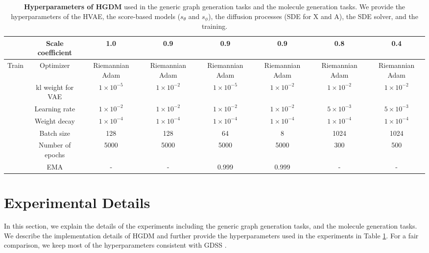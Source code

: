 \documentclass[letterpaper]{article} %
\begin{document}
\begin{table}[htbp]
{\begin{tabular}{cccccccc}
    &Scale coefficient&1.0& 0.9 &0.9 &0.9 &0.8 &0.4\\
    \midrule
    \multirow{7}{*}{Train}&Optimizer &Riemannian Adam &Riemannian Adam &Riemannian Adam &Riemannian Adam &Riemannian Adam &Riemannian Adam \\
    &kl weight for VAE&$1 \times 10^{-5}$&$1 \times 10^{-2}$&$1 \times 10^{-5}$&$1 \times 10^{-2}$& $1 \times 10^{-2}$&$1 \times 10^{-2}$\\
    &Learning rate &$1 \times 10^{-2}$ &$1 \times 10^{-2}$ &$1 \times 10^{-2}$ &$1 \times 10^{-2}$ &$5 \times 10^{-3}$ &$5 \times 10^{-3}$ \\
    &Weight decay &$1 \times 10^{-4}$ &$1 \times 10^{-4}$ &$1 \times 10^{-4}$ &$1 \times 10^{-4}$ &$1 \times 10^{-4}$ &$1 \times 10^{-4}$ \\
    &Batch size &128 &128 &64 &8 &1024 &1024 \\
    &Number of epochs &5000 &5000 &5000 &5000 &300 &500\\
    &EMA&-&-&0.999&0.999&-&-\\
    \bottomrule
  \end{tabular}
  }
  \caption{\textbf{Hyperparameters of HGDM} used in the generic graph generation tasks and the molecule generation tasks. We provide the hyperparameters of the HVAE, the score-based models ($s_\theta$ and $s_\phi$), the diffusion processes (SDE for X and A), the SDE solver, and the training.}
  \label{Hyperparameters}
\end{table}

\section{Experimental Details}
In this section, we explain the details of the experiments including the generic graph generation tasks, and the molecule generation tasks. We describe the implementation details of HGDM and further provide the hyperparameters used in the experiments in Table \ref{Hyperparameters}. For a fair comparison, we keep most of the hyperparameters consistent with GDSS \cite{jo2022score}.
\end{document}
